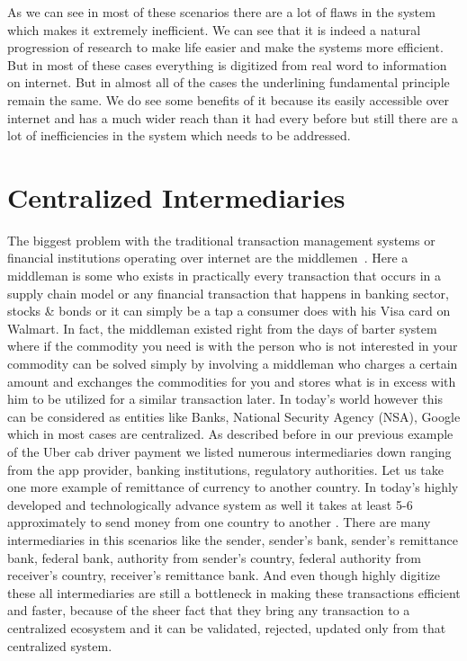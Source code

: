 As we can see in most of these scenarios there are a lot of flaws in
the system which makes it extremely inefficient. We can see that it is
indeed a natural progression of research to make life easier and make
the systems more efficient. But in most of these cases everything is
digitized from real word to information on internet. But in almost all
of the cases the underlining fundamental principle remain the same. We
do see some benefits of it because its easily accessible over internet
and has a much wider reach than it had every before but still there
are a lot of inefficiencies in the system which needs to be addressed.


\section{Centralized Intermediaries}

The biggest problem with the traditional transaction management
systems or financial institutions operating over internet are the
middlemen~\cite{torres10}. Here a middleman is some who exists in
practically every transaction that occurs in a supply chain model or
any financial transaction that happens in banking sector, stocks \&
bonds or it can simply be a tap a consumer does with his Visa card on
Walmart. In fact, the middleman existed right from the days of barter
system where if the commodity you need is with the person who is not
interested in your commodity can be solved simply by involving a
middleman who charges a certain amount and exchanges the commodities
for you and stores what is in excess with him to be utilized for a
similar transaction later. In today's world however this can be
considered as entities like Banks, National Security Agency (NSA),
Google which in most cases are centralized. As described before in our
previous example of the Uber cab driver payment we listed numerous
intermediaries down ranging from the app provider, banking
institutions, regulatory authorities. Let us take one more example
of remittance of currency to another country. In today's highly
developed and technologically advance system as well it takes at least
5-6 approximately to send money from one country to another
\cite{martinez11}. There are many intermediaries in this scenarios
like the sender, sender's bank, sender's remittance bank, federal
bank, authority from sender's country, federal authority from
receiver's country, receiver's remittance bank. And even though highly
digitize these all intermediaries are still a bottleneck in making
these transactions efficient and faster, because of the sheer fact
that they bring any transaction to a centralized ecosystem and it can
be validated, rejected, updated only from that centralized system.

